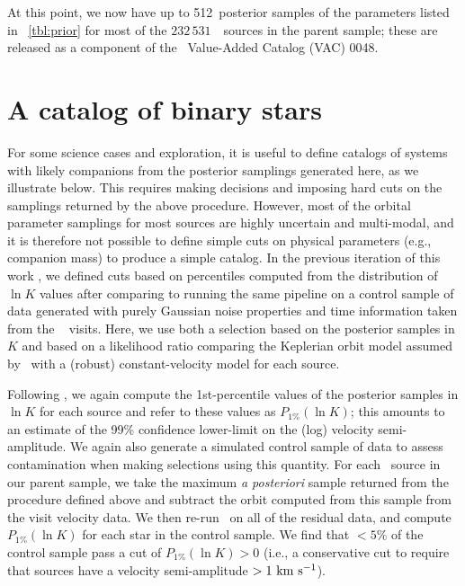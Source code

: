 \documentclass[modern]{aastex63}
\newcommand{\nsources}{\ensuremath{232\,531}}
\newcommand{\Kminval}{512}
\begin{document}
At this point, we now have up to \Kminval\ posterior samples of the parameters
listed in \tablename~\ref{tbl:prior} for most of the \nsources\ \apogee\ sources
in the parent sample; these are released as a component of the \sdss\
Value-Added Catalog (VAC) 0048.


\section{A catalog of binary stars} \label{sec:catalog}

For some science cases and exploration, it is useful to define catalogs of
systems with likely companions from the posterior samplings generated here, as
we illustrate below.
This requires making decisions and imposing hard cuts on the samplings returned
by the above procedure.
However, most of the orbital parameter samplings for most sources are highly
uncertain and multi-modal, and it is therefore not possible to define simple
cuts on physical parameters (e.g., companion mass) to produce a simple catalog.
In the previous iteration of this work \citep{Price-Whelan:2018}, we defined
cuts based on percentiles computed from the distribution of $\ln K$ values after
comparing to running the same pipeline on a control sample of data generated
with purely Gaussian noise properties and time information taken from the
\apogee\ \dr{14} visits.
Here, we use both a selection based on the posterior samples in $K$ and based on
a likelihood ratio comparing the Keplerian orbit model assumed by \thejoker\
with a (robust) constant-velocity model for each source.

Following \citet{Price-Whelan:2018}, we again compute the 1st-percentile values
of the posterior samples in $\ln K$ for each source and refer to these values as
$P_{1\%}(\ln K)$;
this amounts to an estimate of the 99\% confidence lower-limit on the (log)
velocity semi-amplitude.
We again also generate a simulated control sample of data to assess
contamination when making selections using this quantity.
For each \apogee\ source in our parent sample, we take the maximum \textsl{a
posteriori} sample returned from the procedure defined above and subtract the
orbit computed from this sample from the visit velocity data.
We then re-run \thejoker\ on all of the residual data, and compute $P_{1\%}(\ln
K)$ for each star in the control sample.
We find that $<5\%$ of the control sample pass a cut of $P_{1\%}(\ln K) > 0$
(i.e., a conservative cut to require that sources have a velocity semi-amplitude
$> 1~\mathrm{km}~\mathrm{s}^{-1}$).
\end{document}
